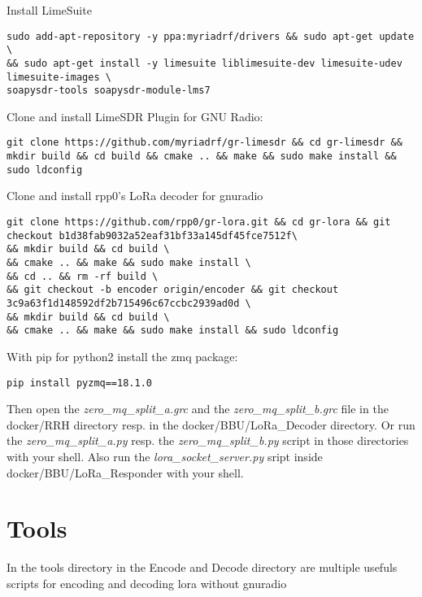 Install LimeSuite

\begin{verbatim}
sudo add-apt-repository -y ppa:myriadrf/drivers && sudo apt-get update \
&& sudo apt-get install -y limesuite liblimesuite-dev limesuite-udev limesuite-images \
soapysdr-tools soapysdr-module-lms7
\end{verbatim}

Clone and install LimeSDR Plugin for GNU Radio:

\begin{verbatim}
git clone https://github.com/myriadrf/gr-limesdr && cd gr-limesdr && mkdir build && cd build && cmake .. && make && sudo make install && sudo ldconfig
\end{verbatim}

Clone and install rpp0's LoRa decoder for gnuradio

\begin{verbatim}
git clone https://github.com/rpp0/gr-lora.git && cd gr-lora && git checkout b1d38fab9032a52eaf31bf33a145df45fce7512f\
&& mkdir build && cd build \
&& cmake .. && make && sudo make install \
&& cd .. && rm -rf build \
&& git checkout -b encoder origin/encoder && git checkout 3c9a63f1d148592df2b715496c67ccbc2939ad0d \
&& mkdir build && cd build \
&& cmake .. && make && sudo make install && sudo ldconfig
\end{verbatim}

With pip for python2 install the zmq package:

\begin{verbatim}
pip install pyzmq==18.1.0
\end{verbatim}

Then open the \emph{zero\_mq\_split\_a.grc} and the
\emph{zero\_mq\_split\_b.grc} file in the docker/RRH directory resp. in
the docker/BBU/LoRa\_Decoder directory. Or run the
\emph{zero\_mq\_split\_a.py} resp. the \emph{zero\_mq\_split\_b.py}
script in those directories with your shell. Also run the
\emph{lora\_socket\_server.py} sript inside docker/BBU/LoRa\_Responder
with your shell.

\section{Tools}\label{tools}

In the tools directory in the Encode and Decode directory are multiple
usefuls scripts for encoding and decoding lora without gnuradio

